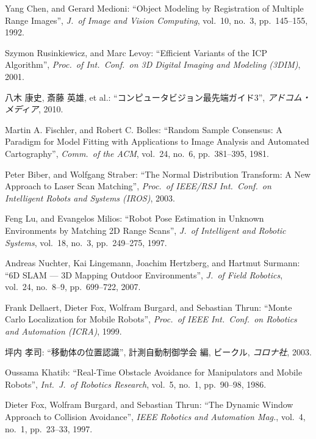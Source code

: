 \documentclass[uplatex, twocolumn, 9pt]{jsproceedings}
\begin{document}
\begin{thebibliography}{99}
Yang Chen, and Gerard Medioni: ``Object Modeling by Registration of Multiple Range Images'', \textit{J.\ of Image and Vision Computing}, vol.~10, no.~3, pp.~145--155, 1992.

Szymon Rusinkiewicz, and Marc Levoy: ``Efficient Variants of the ICP Algorithm'', \textit{Proc.\ of Int.\ Conf.\ on 3D Digital Imaging and Modeling (3DIM)}, 2001.

八木 康史, 斎藤 英雄, et al.: ``コンピュータビジョン最先端ガイド3'', \textit{アドコム・メディア}, 2010.

Martin A. Fischler, and Robert C. Bolles: ``Random Sample Consensus: A Paradigm for Model Fitting with Applications to Image Analysis and Automated Cartography'', \textit{Comm.\ of the ACM}, vol.~24, no.~6, pp.~381--395, 1981.

Peter Biber, and Wolfgang Straber: ``The Normal Distribution Transform: A New Approach to Laser Scan Matching'', \textit{Proc.\ of IEEE/RSJ Int.\ Conf.\ on Intelligent Robots and Systems (IROS)}, 2003.

Feng Lu, and Evangelos Milios: ``Robot Pose Estimation in Unknown Environments by Matching 2D Range Scans'', \textit{J.\ of Intelligent and Robotic Systems}, vol.~18, no.~3, pp.~249--275, 1997.

Andreas Nuchter, Kai Lingemann, Joachim Hertzberg, and Hartmut Surmann: ``6D SLAM --- 3D Mapping Outdoor Environments'', \textit{J.\ of Field Robotics}, vol.~24, no.~8--9, pp.~699--722, 2007.

Frank Dellaert, Dieter Fox, Wolfram Burgard, and Sebastian Thrun: ``Monte Carlo Localization for Mobile Robots'', \textit{Proc.\ of IEEE Int.\ Conf.\ on Robotics and Automation (ICRA)}, 1999.

坪内 孝司: ``移動体の位置認識'', 計測自動制御学会 編, ビークル, \textit{コロナ社}, 2003.

Oussama Khatib: ``Real-Time Obstacle Avoidance for Manipulators and Mobile Robots'', \textit{Int.\ J.\ of Robotics Research}, vol.~5, no.~1, pp.~90--98, 1986.

Dieter Fox, Wolfram Burgard, and Sebastian Thrun: ``The Dynamic Window Approach to Collision Avoidance'', \textit{IEEE Robotics and Automation Mag.}, vol.~4, no.~1, pp.~23--33, 1997.

\end{thebibliography}
\normalsize
\end{document}
